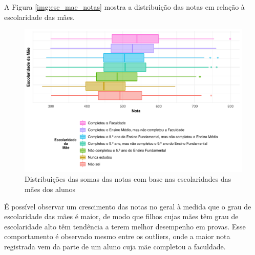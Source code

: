 \newpage
A Figura \autoref{img:esc_mae_notas} mostra a distribuição das notas em relação à escolaridade
das mães.
\begin{figure}[h]
    \caption{Distribuições das somas das notas com base nas escolaridades 
    das mães dos alunos\label{img:esc_mae_notas}}
    \begin{center}
        \includegraphics[width=16cm]{img/esc_mae_notas.pdf}
    \end{center}

\end{figure}

É possível observar um crescimento das notas no geral à medida que o grau de escolaridade
das mães é maior, de modo que filhos cujas mães têm grau de escolaridade alto têm tendência
a terem melhor desempenho em provas. Esse comportamento é observado mesmo entre os outliers,
onde a maior nota registrada vem da parte de um aluno cuja mãe completou a faculdade.



